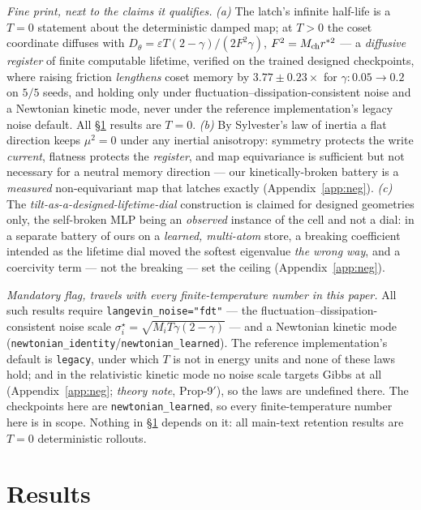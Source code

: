 \documentclass{article}
\begin{document}
{\footnotesize
\emph{Fine print, next to the claims it qualifies.} \emph{(a)} The latch's infinite half-life is a $T=0$ statement about the deterministic damped map; at $T>0$ the coset coordinate diffuses with $D_\theta=\varepsilon T(2-\gamma)/(2F^2\gamma)$, $F^2=M_{\rm ch}r^{*2}$ --- a \emph{diffusive register} of finite computable lifetime, verified on the trained designed checkpoints, where raising friction \emph{lengthens} coset memory by $3.77\pm0.23\times$ for $\gamma:0.05\to0.2$ on $5/5$ seeds, and holding only under fluctuation--dissipation-consistent noise and a Newtonian kinetic mode, never under the reference implementation's legacy noise default. All \S\ref{sec:results} results are $T=0$. \emph{(b)} By Sylvester's law of inertia a flat direction keeps $\mu^2=0$ under any inertial anisotropy: symmetry protects the write \emph{current}, flatness protects the \emph{register}, and map equivariance is sufficient but not necessary for a neutral memory direction --- our kinetically-broken battery is a \emph{measured} non-equivariant map that latches exactly (Appendix~\ref{app:neg}). \emph{(c)} The \emph{tilt-as-a-designed-lifetime-dial} construction is claimed for designed geometries only, the self-broken MLP being an \emph{observed} instance of the cell and not a dial: in a separate battery of ours on a \emph{learned, multi-atom} store, a breaking coefficient intended as the lifetime dial moved the softest eigenvalue \emph{the wrong way}, and a coercivity term --- not the breaking --- set the ceiling (Appendix~\ref{app:neg}).

\emph{Mandatory flag, travels with every finite-temperature number in this paper.} All such results require \texttt{langevin\_noise="fdt"} --- the fluctuation--dissipation-consistent noise scale $\sigma^\star_i=\sqrt{M_iT\gamma(2-\gamma)}$ --- and a Newtonian kinetic mode (\texttt{newtonian\_identity}/\texttt{newtonian\_learned}). The reference implementation's default is \texttt{legacy}, under which $T$ is not in energy units and none of these laws hold; and in the relativistic kinetic mode no noise scale targets Gibbs at all (Appendix~\ref{app:neg}; \emph{theory note}, Prop-9$'$), so the laws are undefined there. The checkpoints here are \texttt{newtonian\_learned}, so every finite-temperature number here is in scope. Nothing in \S\ref{sec:results} depends on it: all main-text retention results are $T=0$ deterministic rollouts.
\par}

\section{Results}\label{sec:results}
\end{document}
